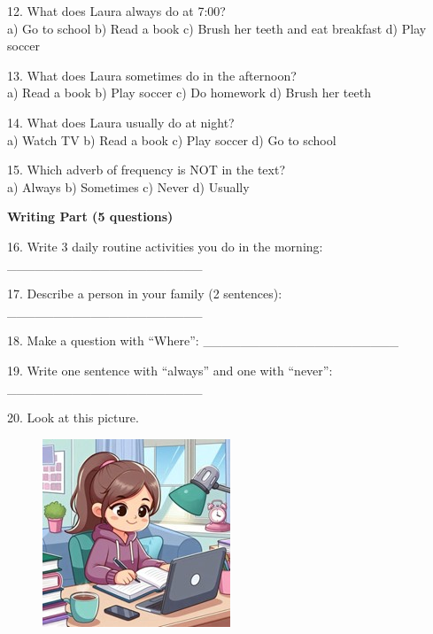 \documentclass[12pt, a4paper]{article}
\begin{document}
\smallskip

12. What does Laura always do at 7:00?\\
a) Go to school \quad b) Read a book \quad c) Brush her teeth and eat breakfast \quad d) Play soccer

\smallskip

13. What does Laura sometimes do in the afternoon?\\
a) Read a book \quad b) Play soccer \quad c) Do homework \quad d) Brush her teeth

\smallskip

14. What does Laura usually do at night?\\
a) Watch TV \quad b) Read a book \quad c) Play soccer \quad d) Go to school

\smallskip

15. Which adverb of frequency is NOT in the text?\\
a) Always \quad b) Sometimes \quad c) Never \quad d) Usually

\begin{center}
    \large \textbf{Writing Part (5 questions)}
\end{center}

16. Write 3 daily routine activities you do in the morning: \_\_\_\_\_\_\_\_\_\_\_\_\_\_\_\_\_\_\_\_\_

\smallskip

17. Describe a person in your family (2 sentences): \_\_\_\_\_\_\_\_\_\_\_\_\_\_\_\_\_\_\_\_\_

\smallskip

18. Make a question with ``Where'': \_\_\_\_\_\_\_\_\_\_\_\_\_\_\_\_\_\_\_\_\_

\smallskip

19. Write one sentence with ``always'' and one with ``never'': \_\_\_\_\_\_\_\_\_\_\_\_\_\_\_\_\_\_\_\_\_

\vfill\break{}

20. Look at this picture.

\begin{figure}[H]
    \includegraphics[width=.4\linewidth]{../../../images/Imagen2.jpg}
\end{figure}
\end{document}

